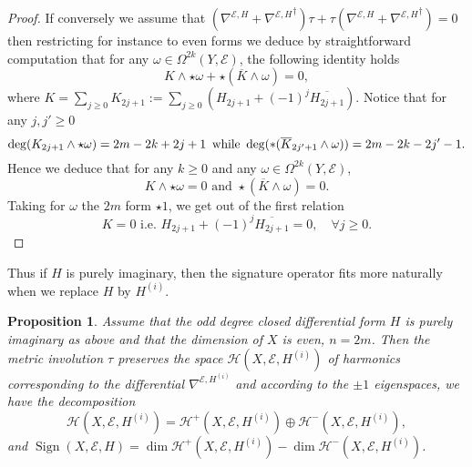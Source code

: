 \documentclass[12pt]{amsart}
\theoremstyle{plain}
\newtheorem{proposition}[theorem]{Proposition}
\theoremstyle{definition}
\theoremstyle{remark}
\begin{document}
\begin{proof}
 If conversely we assume that $(\nabla^{{\mathcal E}, H} + {\nabla^{{\mathcal E}, H}}^\dagger)  \tau + \tau (\nabla^{{\mathcal E}, H} + {\nabla^{{\mathcal E}, H}}^\dagger) = 0$ then restricting for instance to even forms we deduce by straightforward computation that for any $\omega \in\Omega^{2k} (Y, {\mathcal E})$, the following identity holds
$$
K\wedge \star\omega + \star ({\overline{K}}\wedge \omega) =0,
$$
where $K= \sum_{j\geq 0} K_{2j+1} := \sum_{j\geq 0} (H_{2j+1} + (-1)^j  {\overline{H_{2j+1}}})$. Notice that for any $j, j'\geq 0$ 
$$
{\rm deg} (K_{2j+1} \wedge \star\omega ) = {{2m - 2k +2j+1}}\, \text{ while }\, {\rm deg} (* ({\overline{K}}_{2j'+1} \wedge \omega)) = {{2m -2k -2j'-1}}.
$$
Hence we deduce that for any $k\geq 0$ and any $\omega\in \Omega^{2k} (Y, {\mathcal E})$,
$$
K\wedge \star\omega = 0 \text{ and } \star ({\overline{K}}\wedge \omega) =0.
$$
Taking for $\omega$ the {{$2m$}} form $\star 1$, we get out of the first relation
$$
K = 0 \text{ i.e. } H_{2j+1} + (-1)^j  {\overline{H_{2j+1}}} = 0, \quad \forall j\geq 0.
$$
\end{proof}

{{Thus if $H$ is purely imaginary, then the signature operator fits more naturally when we replace $H$ by $H^{(i)}$.}}

\begin{proposition}
{{ Assume  that the odd degree closed differential form $H$ is purely imaginary as above and that the dimension of $X$ is even, $n=2m$. Then the metric involution $\tau$ 
preserves the space 
${\mathcal H} (X, {\mathcal E}, H^{(i)})$ of harmonics corresponding to the differential $\nabla^{{\mathcal E}, H^{(i)}}$ and according to the $\pm 1$ eigenspaces, we have the decomposition
$$
{\mathcal H} (X, {\mathcal E}, H^{(i)}) = {\mathcal H}^+ (X, {\mathcal E}, H^{(i)}) \oplus {\mathcal H}^- (X, {\mathcal E}, H^{(i)}),
$$
and ${\operatorname{Sign}} (X, {\mathcal E}, H) = \dim {\mathcal H}^+ (X, {\mathcal E}, H^{(i)})- \dim {\mathcal H}^- (X, {\mathcal E}, H^{(i)})$.
}}
\end{proposition}
\end{document}
